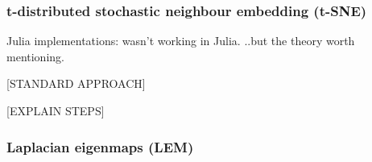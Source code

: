\documentclass[journal, a4paper]{IEEEtran}
\begin{document}
\subsubsection{t-distributed stochastic neighbour embedding (t-SNE)}


%
%
% 
%

Julia implementations:
wasn't working in Julia. ..but the theory worth mentioning.


[STANDARD APPROACH]


[EXPLAIN STEPS]





\subsubsection{Laplacian eigenmaps (LEM)}\\
\end{document}
